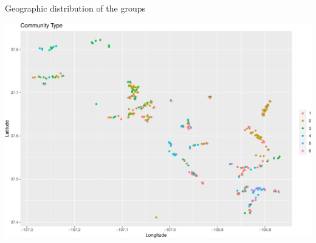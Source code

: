 \documentclass[
  ignorenonframetext,
]{beamer}
\begin{document}
\begin{frame}{Geographic distribution of the groups}
\protect\hypertarget{geographic-distribution-of-the-groups}{}

\includegraphics{unsupervised_learning_files/figure-beamer/unnamed-chunk-16-1.pdf}

\end{frame}
\end{document}
